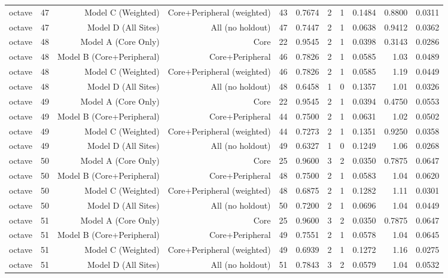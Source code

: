 {\begin{longtable}{lrrrrrrrrrr}
  octave & 47 & Model C (Weighted) & Core+Peripheral (weighted) & 43 & 0.7674 & 2 & 1 & 0.1484 & 0.8800 & 0.0311 \\
  octave & 47 & Model D (All Sites) & All (no holdout) & 47 & 0.7447 & 2 & 1 & 0.0638 & 0.9412 & 0.0362 \\
  octave & 48 & Model A (Core Only) & Core & 22 & 0.9545 & 2 & 1 & 0.0398 & 0.3143 & 0.0286 \\
  octave & 48 & Model B (Core+Peripheral) & Core+Peripheral & 46 & 0.7826 & 2 & 1 & 0.0585 & 1.03 & 0.0489 \\
  octave & 48 & Model C (Weighted) & Core+Peripheral (weighted) & 46 & 0.7826 & 2 & 1 & 0.0585 & 1.19 & 0.0449 \\
  octave & 48 & Model D (All Sites) & All (no holdout) & 48 & 0.6458 & 1 & 0 & 0.1357 & 1.01 & 0.0326 \\
  octave & 49 & Model A (Core Only) & Core & 22 & 0.9545 & 2 & 1 & 0.0394 & 0.4750 & 0.0553 \\
  octave & 49 & Model B (Core+Peripheral) & Core+Peripheral & 44 & 0.7500 & 2 & 1 & 0.0631 & 1.02 & 0.0502 \\
  octave & 49 & Model C (Weighted) & Core+Peripheral (weighted) & 44 & 0.7273 & 2 & 1 & 0.1351 & 0.9250 & 0.0358 \\
  octave & 49 & Model D (All Sites) & All (no holdout) & 49 & 0.6327 & 1 & 0 & 0.1249 & 1.06 & 0.0268 \\
  octave & 50 & Model A (Core Only) & Core & 25 & 0.9600 & 3 & 2 & 0.0350 & 0.7875 & 0.0647 \\
  octave & 50 & Model B (Core+Peripheral) & Core+Peripheral & 48 & 0.7500 & 2 & 1 & 0.0583 & 1.04 & 0.0620 \\
  octave & 50 & Model C (Weighted) & Core+Peripheral (weighted) & 48 & 0.6875 & 2 & 1 & 0.1282 & 1.11 & 0.0301 \\
  octave & 50 & Model D (All Sites) & All (no holdout) & 50 & 0.7200 & 2 & 1 & 0.0696 & 1.04 & 0.0449 \\
  octave & 51 & Model A (Core Only) & Core & 25 & 0.9600 & 3 & 2 & 0.0350 & 0.7875 & 0.0647 \\
  octave & 51 & Model B (Core+Peripheral) & Core+Peripheral & 49 & 0.7551 & 2 & 1 & 0.0578 & 1.04 & 0.0645 \\
  octave & 51 & Model C (Weighted) & Core+Peripheral (weighted) & 49 & 0.6939 & 2 & 1 & 0.1272 & 1.16 & 0.0275 \\
  octave & 51 & Model D (All Sites) & All (no holdout) & 51 & 0.7843 & 3 & 2 & 0.0579 & 1.04 & 0.0532 \\

\end{longtable}}
